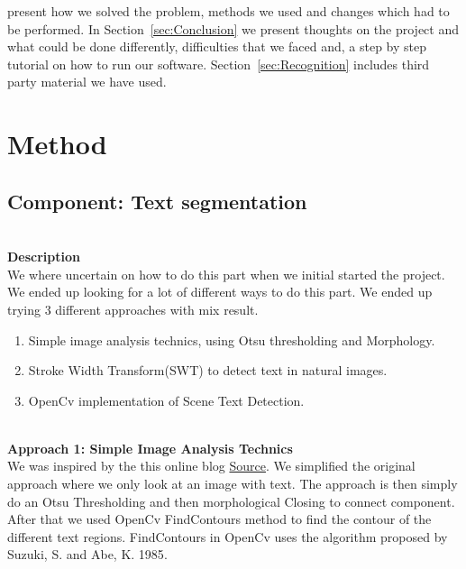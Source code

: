 \documentclass[11pt,a4paper,UKenglish]{article}
\begin{document}
 present how we solved the problem, methods we used and
changes which had to be performed. In Section~\ref{sec:Conclusion} we
present thoughts on the project and what could be done differently,
difficulties that we faced and, a step by step tutorial on how to run our
software. Section~\ref{sec:Recognition} includes third party material we have used.



\newpage
\section{Method}
\label{sec:Method}
\subsection{Component: Text segmentation}
\label{Method:Text_segmentation}
\noindent \\ \textbf{Description}
\noindent \\ We where uncertain on how to do this part when we initial started the project. We ended up looking for a lot of different ways to do this part. We ended up trying 3 different approaches with mix result.
\begin{enumerate}
  \item Simple image analysis technics, using Otsu thresholding and Morphology.
  \item Stroke Width Transform(SWT) to detect text in natural images.
  \item OpenCv implementation of Scene Text Detection.
\end{enumerate}

\noindent \\ \textbf{Approach 1: Simple Image Analysis Technics}
\noindent \\ We was inspired by the this online blog \href{https://www.danvk.org/2015/01/07/finding-blocks-of-text-in-an-image-using-python-opencv-and-numpy.html}{Source}\cite{_finding_????}. We simplified the original approach where we only look at an image with text. The approach is then simply do an Otsu Thresholding and then morphological Closing to connect component. After that we used OpenCv FindContours method to find the contour of the different text regions. FindContours in OpenCv uses the algorithm proposed by Suzuki, S. and Abe, K. 1985\cite{suzuki_topological_????}.
\end{document}
